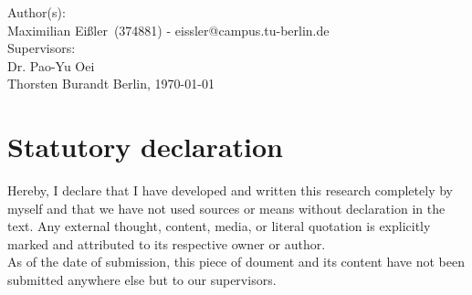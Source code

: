 \documentclass[
	11pt,								%
	DIV10,								%
	a4paper,         					%
	oneside,							%
	headheight=20pt,					%
	footheight=20pt,					%
    parskip=full,						%
    listof=totoc,						%
	bibliography=totoc,					%
	index=totoc,						%
]{scrartcl}
\makeatletter
\newcommand{\autor}{Maximilian Eißler} 		%
\newcommand{\matriculation}{374881}
\newcommand{\mailaddress}{eissler@campus.tu-berlin.de}
\newcommand{\betreuer}{Dr. Pao-Yu Oei} 		%
\newcommand{\betreuerzwei}{Thorsten Burandt}
\newcommand{\engdate}{\selectlanguage{english}\today}
\makeatother
\begin{document}
\begin{titlepage}
\begin{center}

			\vfill
			\normalsize
			Author(s): \\
			\autor \, (\matriculation) - \mailaddress \\
            \vfill
			Supervisors:\\\betreuer	\\
			\betreuerzwei
            \vfill
			Berlin, \engdate
		\end{center}
		
	\end{titlepage}
	\newpage
	


\setcounter{page}{2}							%
%	
%
%	

\section*{Statutory declaration}
	Hereby, I declare that I have developed and written this research completely by myself and that we have not used sources or means without declaration in the text. Any external thought, content, media, or literal quotation is explicitly marked and attributed to its respective owner or author. \\
	As of the date of submission, this piece of doument and its content have not been submitted anywhere else but to our supervisors.
	
	\bigskip
	
\end{document}

